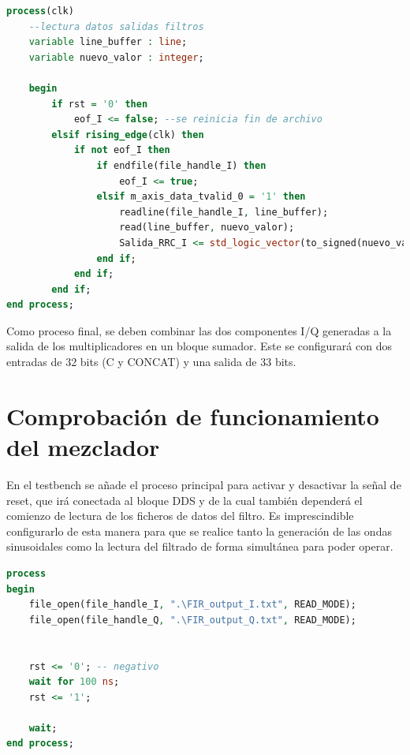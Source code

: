 \begin{lstlisting}[language=VHDL, style=mystyle, caption={Proceso de lectura del fichero de salida del filtrado (rama I)}]
process(clk) 
    --lectura datos salidas filtros
    variable line_buffer : line;
    variable nuevo_valor : integer;
        
    begin
        if rst = '0' then
            eof_I <= false; --se reinicia fin de archivo
        elsif rising_edge(clk) then 
            if not eof_I then
                if endfile(file_handle_I) then 
                    eof_I <= true; 
                elsif m_axis_data_tvalid_0 = '1' then
                    readline(file_handle_I, line_buffer);
                    read(line_buffer, nuevo_valor);
                    Salida_RRC_I <= std_logic_vector(to_signed(nuevo_valor, Salida_RRC_I'length));
                end if;
            end if;
        end if;    
end process;  
\end{lstlisting}

\vspace{3mm}

Como proceso final, se deben combinar las dos componentes I/Q generadas a la salida de los multiplicadores en un bloque sumador. Este se configurará con dos entradas de 32 bits (C y CONCAT) y una salida de 33 bits.


\section{Comprobación de funcionamiento del mezclador}

En el testbench se añade el proceso principal para activar y desactivar la señal de reset, que irá conectada al bloque DDS y de la cual también dependerá el comienzo de lectura de los ficheros de datos del filtro. Es imprescindible configurarlo de esta manera para que se realice tanto la generación de las ondas sinusoidales como la lectura del filtrado de forma simultánea para poder operar.

\vspace{3mm}

\begin{lstlisting}[language=VHDL, style=mystyle, caption={Proceso de estimulación}]
process
begin
    file_open(file_handle_I, ".\FIR_output_I.txt", READ_MODE);
    file_open(file_handle_Q, ".\FIR_output_Q.txt", READ_MODE);
  
  
    rst <= '0'; -- negativo
    wait for 100 ns;
    rst <= '1';               

    wait;
end process;
\end{lstlisting}









